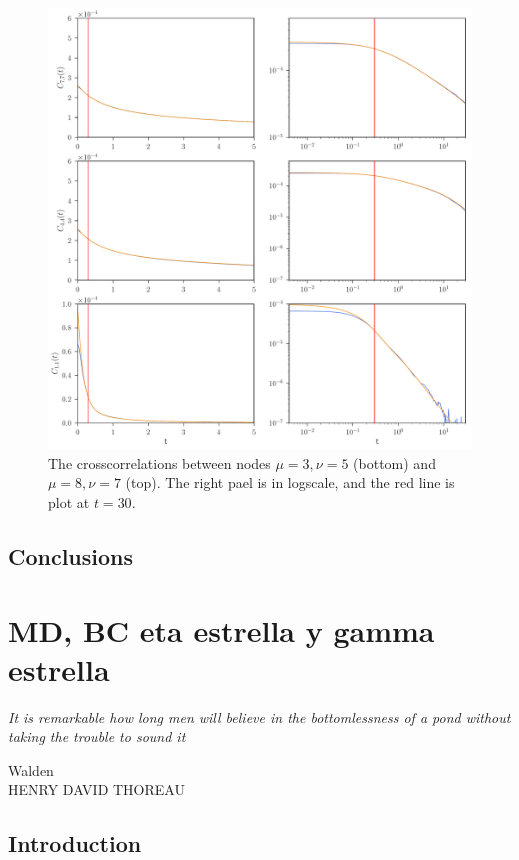 \documentclass[a4paper,openright,12pt]{book}
\begin{document}
\begin{figure}[h!]
  \centering
\includegraphics[scale=0.45]{PredictionsCross-WALLS-17nodes}
\caption[Predicted autocorrelations of $C(t)$ for 17 nodes.]{The crosscorrelations between nodes $\mu=3,\nu=5$ (bottom) and  $\mu=8,\nu=7$ (top). The right pael is in logscale, and the red line is plot at $t=30$.}
\label{fig:PredictionsCross-WALLS-17nodes}
\end{figure}





\section{Conclusions}

\chapter{MD, BC eta estrella y gamma estrella}
\label{Chap:Slip}
\epigraph{\textit{It is remarkable how long men will believe in the bottomlessness of a pond without taking the trouble to sound it}}{Walden \\ HENRY DAVID THOREAU}
\section{Introduction}
\end{document}
